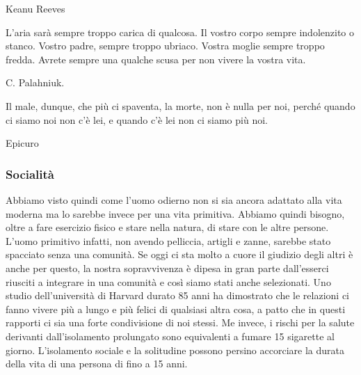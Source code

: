 \documentclass[12pt]{book} %
\begin{document}
\begin{mdframed}[linewidth=1pt]
Keanu Reeves


\bigskip

L'aria sarà sempre troppo carica di qualcosa. Il vostro corpo sempre indolenzito o stanco. Vostro
padre, sempre troppo ubriaco. Vostra moglie sempre troppo fredda. Avrete sempre una qualche scusa per non vivere la
vostra vita.

C. Palahniuk.


\bigskip

Il male, dunque, che più ci spaventa, la morte, non è nulla per noi, perché quando ci siamo noi non c'è lei, e quando
c'è lei non ci siamo più noi. 

Epicuro
\end{mdframed}

\bigskip

\subsubsection{Socialità}
Abbiamo visto quindi come l'uomo odierno non si sia ancora adattato alla vita moderna ma lo sarebbe
invece per una vita primitiva. Abbiamo quindi bisogno, oltre a fare esercizio fisico e stare nella natura, di stare con
le altre persone. L'uomo primitivo infatti, non avendo pelliccia, artigli e zanne, sarebbe stato
spacciato senza una comunità. Se oggi ci sta molto a cuore il giudizio degli altri è anche per questo, la nostra
sopravvivenza è dipesa in gran parte dall'esserci riusciti a integrare in una comunità e così siamo stati anche selezionati. 
Uno studio dell'università di Harvard durato 85 anni ha dimostrato che le relazioni ci fanno vivere più a lungo e più felici di qualsiasi altra cosa, a patto che in questi rapporti ci sia una forte condivisione di noi stessi.
Me invece, i rischi per la salute derivanti dall’isolamento prolungato sono equivalenti a fumare 15 sigarette al giorno. L’isolamento sociale e la solitudine possono persino accorciare la durata della vita di una persona di fino a 15 anni.
\end{document}
